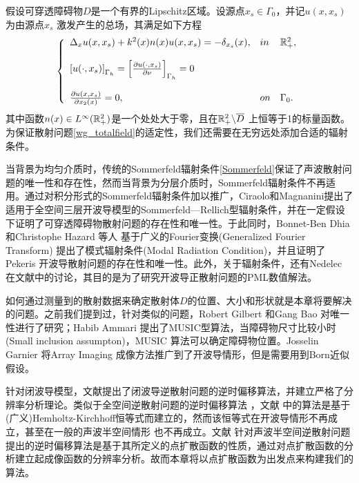 假设可穿透障碍物$D$是一个有界的Lipschitz区域。设源点$x_s\in\Gamma_0$，并记$u(x,x_s)$ 为由源点$x_s$ 激发产生的总场，其满足如下方程
\begin{eqnarray}\label{wg_totalfield}
\left\{
\begin{array}{lll}
 \Delta_x u(x,x_s)+k^2(x)n(x)u(x,x_s)=-\delta_{x_s}(x), &in& \mathbb{R}^2_+,\\
 & &\\
 \left[u(\cdot,x_s)\right]_{\Gamma_h}=\left[\frac{\partial u(\cdot,x_s)}{\partial\nu}\right]_{\Gamma_h}=0\\
 & &\\
 \frac{\partial u(x,x_s)}{\partial x_2(x)}=0,  &on& \Gamma_0.
 \end{array}
 \right.
\end{eqnarray}
其中函数$n(x)\in L^{\infty}(\mathbb{R}^2_+)$是一个处处大于零，且在$\mathbb{R}^2_+\backslash\overline D$ 上恒等于1的标量函数。
为保证散射问题\eqref{wg_totalfield}的适定性，我们还需要在无穷远处添加合适的辐射条件。

当背景为均匀介质时，传统的Sommerfeld辐射条件\eqref{Sommerfeld}保证了声波散射问题的唯一性和存在性，然而当背景为分层介质时，Sommerfeld辐射条件不再适用。通过对积分形式的Sommerfeld辐射条件加以推广，Ciraolo和Magnanini\cite{Ciraolo2009A1,Ciraolo2009A2}提出了适用于全空间三层开波导模型的Sommerfeld—Rellich型辐射条件，并在一定假设下证明了可穿透障碍物散射问题的存在性和唯一性。于此同时，Bonnet-Ben
Dhia和Christophe Hazard 等人\cite{Dhia2009DIFFRACTION} 基于广义的Fourier变换(Generalized Fourier Transform) 提出了模式辐射条件(Modal Radiation Condition)，并且证明了Pekeris 开波导散射问题的存在性和唯一性。此外，关于辐射条件，还有Nedelec 在文献\cite{Jerez2012Asymptotics}中的讨论，其目的是为了研究开波导正散射问题的PML数值解法。

如何通过测量到的散射数据来确定散射体$D$的位置、大小和形状就是本章将要解决的问题。之前我们提到过，针对类似的问题，Robert Gilbert\cite{Robert2007Inverse} 和Gang Bao\cite{Bao2013Reconstruction} 对唯一性进行了研究；Habib Ammari\cite{Ammari2005Reconstruction} 提出了MUSIC型算法，当障碍物尺寸比较小时(Small inclusion assumpton)，MUSIC 算法可以确定障碍物位置。Josselin Garnier\cite{Garnier2012Correlation} 将Array Imaging 成像方法推广到了开波导情形，但是需要用到Born近似假设。

针对闭波导模型，文献\cite{ch_cw}提出了闭波导逆散射问题的逆时偏移算法，并建立严格了分辨率分析理论。类似于全空间逆散射问题的逆时偏移算法
\cite{cch_a,cch_e,ch_e}，文献
\cite{ch_cw} 中的算法是基于(广义)Hemholtz-Kirchhoff恒等式而建立的，然而该恒等式在开波导情形不再成立，甚至在一般的声波半空间情形
\cite{ch_ha} 也不再成立。文献\cite{ch_ha} 针对声波半空间逆散射问题提出的逆时偏移算法是基于其所定义的点扩散函数的性质，通过对点扩散函数的分析建立起成像函数的分辨率分析。故而本章将以点扩散函数为出发点来构建我们的算法。

